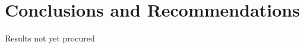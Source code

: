 
\chapter{Conclusions and Recommendations}
\begin{spacing}{2.0}


Results not yet procured


\end{spacing}
\newpage

